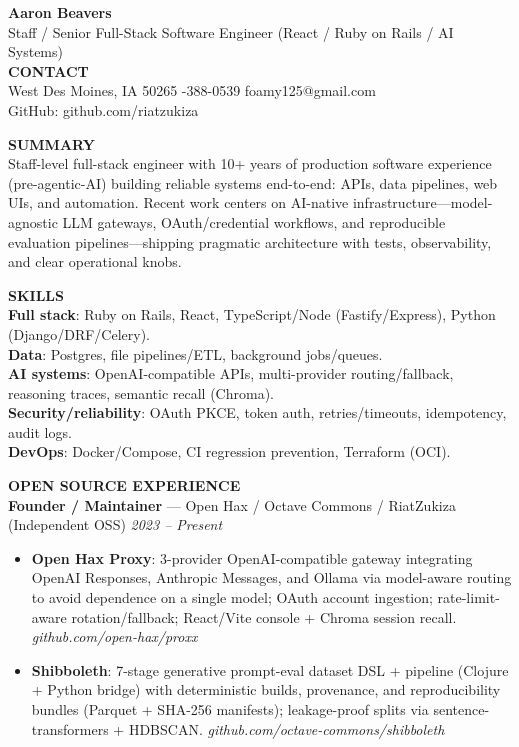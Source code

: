 \documentclass[10pt]{article}
\begin{document}
{\LARGE \textbf{Aaron Beavers}}\\
Staff / Senior Full-Stack Software Engineer (React / Ruby on Rails / AI Systems)\\

\vspace{2pt}
\textbf{CONTACT}\\
West Des Moines, IA 50265 \;\;\textbar\;-388-0539 \;\;\textbar\;\; foamy125@gmail.com\\
GitHub: github.com/riatzukiza

\vspace{6pt}
\textbf{SUMMARY}\\
Staff-level full-stack engineer with 10+ years of production software experience (pre-agentic-AI) building reliable systems end-to-end: APIs, data pipelines, web UIs, and automation. Recent work centers on AI-native infrastructure---model-agnostic LLM gateways, OAuth/credential workflows, and reproducible evaluation pipelines---shipping pragmatic architecture with tests, observability, and clear operational knobs.

\vspace{2pt}
\textbf{SKILLS}\\
\textbf{Full stack}: Ruby on Rails, React, TypeScript/Node (Fastify/Express), Python (Django/DRF/Celery).\\
\textbf{Data}: Postgres, file pipelines/ETL, background jobs/queues.\\
\textbf{AI systems}: OpenAI-compatible APIs, multi-provider routing/fallback, reasoning traces, semantic recall (Chroma).\\
\textbf{Security/reliability}: OAuth PKCE, token auth, retries/timeouts, idempotency, audit logs.\\
\textbf{DevOps}: Docker/Compose, CI regression prevention, Terraform (OCI).

\vspace{6pt}
\textbf{OPEN SOURCE EXPERIENCE}\\

\textbf{Founder / Maintainer} --- Open Hax / Octave Commons / RiatZukiza (Independent OSS) \hfill \textit{2023 -- Present}\\
\vspace{-6pt}
\begin{itemize}
  \setlength\itemsep{-2pt}
  \setlength\parskip{0pt}
  \setlength\parsep{0pt}
  \item \textbf{Open Hax Proxy}: 3-provider OpenAI-compatible gateway integrating OpenAI Responses, Anthropic Messages, and Ollama via model-aware routing to avoid dependence on a single model; OAuth account ingestion; rate-limit-aware rotation/fallback; React/Vite console + Chroma session recall. \textit{github.com/open-hax/proxx}
  \item \textbf{Shibboleth}: 7-stage generative prompt-eval dataset DSL + pipeline (Clojure + Python bridge) with deterministic builds, provenance, and reproducibility bundles (Parquet + SHA-256 manifests); leakage-proof splits via sentence-transformers + HDBSCAN. \textit{github.com/octave-commons/shibboleth}
\end{itemize}
\end{document}
